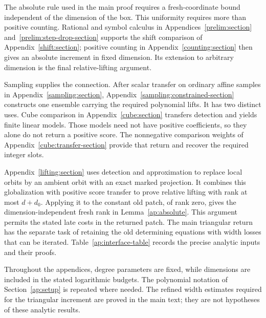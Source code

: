 The absolute rule used in the main proof requires a fresh-coordinate
bound independent of the dimension of the box. This uniformity
requires more than positive counting. Rational and symbol
calculus in Appendices~\ref{prelim:section}
and~\ref{prelim:step-drop-section} supports the shift comparison of
Appendix~\ref{shift:section}; positive counting in
Appendix~\ref{counting:section} then gives an absolute increment in
fixed dimension. Its extension to arbitrary dimension is the final
relative-lifting argument.

Sampling supplies the connection. After scalar transfer on ordinary
affine samples in Appendix~\ref{sampling:section},
Appendix~\ref{sampling:constrained-section} constructs one ensemble
carrying the required polynomial lifts. It has two distinct uses.
Cube comparison in Appendix~\ref{cube:section} transfers detection
and yields finite linear models. Those models need not have positive
coefficients, so they alone do not return a positive score. The
nonnegative comparison weights of Appendix~\ref{cube:transfer-section}
provide that return and recover the required integer slots.

Appendix~\ref{lifting:section} uses detection and approximation to
replace local orbits by an ambient orbit with an exact marked
projection. It combines this globalization with positive score
transfer to prove relative lifting with rank at most $d+d_0$.
Applying it to the
constant old patch, of rank zero, gives the dimension-independent
fresh rank in Lemma~\ref{ap:absolute}. This argument permits the
stated late costs in the returned patch. The main triangular return
has the separate task of retaining the old determining equations
with width losses that can be iterated. Table~\ref{ap:interface-table}
records the precise analytic inputs and their proofs.

Throughout the appendices, degree parameters are fixed, while dimensions
are included in the stated logarithmic budgets. The polynomial notation
of Section~\ref{ap:setup} is repeated where needed. The refined
width estimates required for the triangular increment are proved in
the main text; they are not hypotheses of these analytic results.

